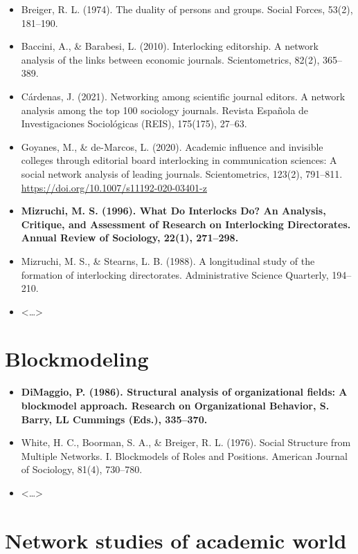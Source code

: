 \documentclass[
]{book}
\begin{document}
\begin{itemize}
\item
  Breiger, R. L. (1974). The duality of persons and groups. Social Forces, 53(2), 181--190.
\item
  Baccini, A., \& Barabesi, L. (2010). Interlocking editorship. A network analysis of the links between economic journals. Scientometrics, 82(2), 365--389.
\item
  Cárdenas, J. (2021). Networking among scientific journal editors. A network analysis among the top 100 sociology journals. Revista Española de Investigaciones Sociológicas (REIS), 175(175), 27--63.
\item
  Goyanes, M., \& de-Marcos, L. (2020). Academic influence and invisible colleges through editorial board interlocking in communication sciences: A social network analysis of leading journals. Scientometrics, 123(2), 791--811. \url{https://doi.org/10.1007/s11192-020-03401-z}
\item
  \textbf{Mizruchi, M. S. (1996). What Do Interlocks Do? An Analysis, Critique, and Assessment of Research on Interlocking Directorates. Annual Review of Sociology, 22(1), 271--298.}
\item
  Mizruchi, M. S., \& Stearns, L. B. (1988). A longitudinal study of the formation of interlocking directorates. Administrative Science Quarterly, 194--210.
\item
  \textless\ldots\textgreater{}
\end{itemize}

\section*{\texorpdfstring{\textbf{Blockmodeling}}{Blockmodeling}}\label{blockmodeling}

\begin{itemize}
\item
  \textbf{DiMaggio, P. (1986). Structural analysis of organizational fields: A blockmodel approach. Research on Organizational Behavior, S. Barry, LL Cummings (Eds.), 335--370.}
\item
  White, H. C., Boorman, S. A., \& Breiger, R. L. (1976). Social Structure from Multiple Networks. I. Blockmodels of Roles and Positions. American Journal of Sociology, 81(4), 730--780.
\item
  \textless\ldots\textgreater{}
\end{itemize}

\section*{\texorpdfstring{\textbf{Network studies of academic world}}{Network studies of academic world}}\label{network-studies-of-academic-world}
\end{document}
